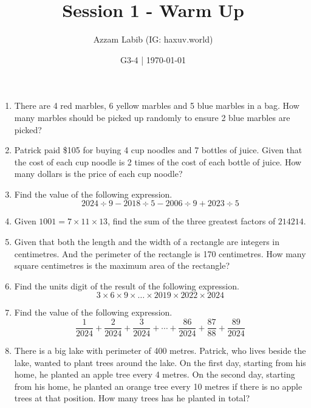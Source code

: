 \documentclass[11pt]{scrartcl}
\title{Session 1 - Warm Up}
\author{Azzam Labib (IG: haxuv.world)}
\date{G3-4 | \today}
\begin{document}
\maketitle

\begin{enumerate}
    \item There are 4 red marbles, 6 yellow marbles and 5 blue marbles in a bag. How many marbles should be picked up randomly to ensure 2 blue marbles are picked?
    
    \vspace{10cm}\item Patrick paid \$105 for buying 4 cup noodles and 7 bottles of juice. Given that the cost of each cup noodle is 2 times of the cost of each bottle of juice. How many dollars is the price of each cup noodle?

    \vspace{10cm}\item Find the value of the following expression.
    \[2024 \div 9 - 2018 \div 5 - 2006 \div 9 + 2023 \div 5\]
    
    \vspace{10cm}\item Given $1001 = 7 \times 11 \times 13$, find the sum of the three greatest factors of $214214$.

    \newpage
    \vspace{10cm}\item Given that both the length and the width of a rectangle are integers in centimetres. And the perimeter of the rectangle is 170 centimetres. How many square centimetres is the maximum area of the rectangle?
    
    \vspace{10cm}\item Find the units digit of the result of the following expression.
    \[3 \times 6 \times 9 \times \dots \times 2019 \times 2022 \times 2024\]
    
    \vspace{10cm}\item Find the value of the following expression.
    \[\frac{1}{2024} + \frac{2}{2024} + \frac{3}{2024} + \cdots + \frac{86}{2024} + \frac{87}{88} + \frac{89}{2024}\]

    \vspace{10cm}\item There is a big lake with perimeter of 400 metres. Patrick, who lives beside the lake, wanted to plant trees around the lake. On the first day, starting from his home, he planted an apple tree every 4 metres. On the second day, starting from his home, he planted an orange tree every 10 metres if there is no apple trees at that position. How many trees has he planted in total?
    

\end{enumerate}
\end{document}

